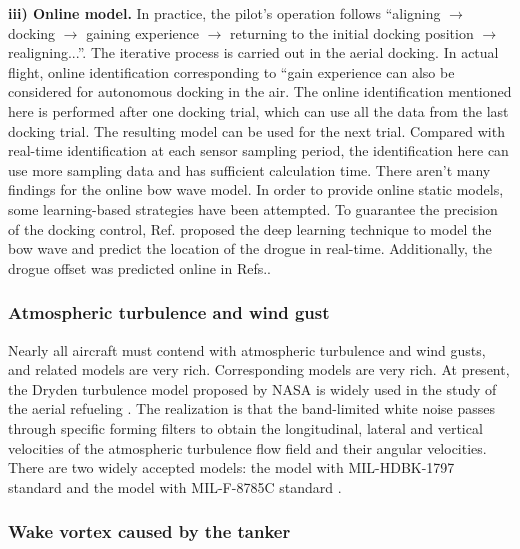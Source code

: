 \textbf{iii) Online model.} In practice, the pilot's operation follows
``aligning $\rightarrow$ docking $\rightarrow$ gaining experience
$\rightarrow$ returning to the initial docking position $\rightarrow$
realigning...\textquotedblright . The iterative process is carried
out in the aerial docking. In actual flight, online identification
corresponding to \textquotedblleft gain experience\textquotedbl{}
can also be considered for autonomous docking in the air. The online
identification mentioned here is performed after one docking trial,
which can use all the data from the last docking trial. The resulting
model can be used for the next trial. Compared with real-time identification
at each sensor sampling period, the identification here can use more
sampling data and has sufficient calculation time. There aren't many
findings for the online bow wave model. In order to provide online
static models, some learning-based strategies have been attempted.
To guarantee the precision of the docking control, Ref. \cite{liu2018deep}
proposed the deep learning technique to model the bow wave and predict
the location of the drogue in real-time. Additionally, the drogue
offset was predicted online in Refs.\cite{dai2018iterative,dai2018terminal}. 

\subsubsection{Atmospheric turbulence and wind gust}

Nearly all aircraft must contend with atmospheric turbulence and wind
gusts, and related models are very rich. Corresponding models are
very rich. At present, the Dryden turbulence model proposed by NASA
is widely used in the study of the aerial refueling \cite{burns2005automated}.
The realization is that the band-limited white noise passes through
specific forming filters to obtain the longitudinal, lateral and vertical
velocities of the atmospheric turbulence flow field and their angular
velocities. There are two widely accepted models: the model with MIL-HDBK-1797
standard \cite{specification1997flying} and the model with MIL-F-8785C
standard \cite{specification1980flying}. 

\subsubsection{Wake vortex caused by the tanker}

